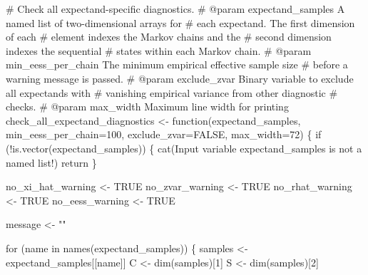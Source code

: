 \documentclass[
  letterpaper,
  DIV=11,
  numbers=noendperiod]{scrartcl}
\newenvironment{Shaded}{\begin{snugshade}}{\end{snugshade}}
\newcommand{\AttributeTok}[1]{\textcolor[rgb]{0.40,0.45,0.13}{#1}}
\newcommand{\CommentTok}[1]{\textcolor[rgb]{0.37,0.37,0.37}{#1}}
\newcommand{\ConstantTok}[1]{\textcolor[rgb]{0.56,0.35,0.01}{#1}}
\newcommand{\ControlFlowTok}[1]{\textcolor[rgb]{0.00,0.23,0.31}{#1}}
\newcommand{\DecValTok}[1]{\textcolor[rgb]{0.68,0.00,0.00}{#1}}
\newcommand{\FunctionTok}[1]{\textcolor[rgb]{0.28,0.35,0.67}{#1}}
\newcommand{\NormalTok}[1]{\textcolor[rgb]{0.00,0.23,0.31}{#1}}
\newcommand{\OtherTok}[1]{\textcolor[rgb]{0.00,0.23,0.31}{#1}}
\newcommand{\SpecialCharTok}[1]{\textcolor[rgb]{0.37,0.37,0.37}{#1}}
\newcommand{\StringTok}[1]{\textcolor[rgb]{0.13,0.47,0.30}{#1}}
\begin{document}
\begin{Shaded}
\begin{Highlighting}[]
\CommentTok{\# Check all expectand{-}specific diagnostics.}
\CommentTok{\# @param expectand\_samples A named list of two{-}dimensional arrays for }
\CommentTok{\#                          each expectand.  The first dimension of each}
\CommentTok{\#                          element indexes the Markov chains and the }
\CommentTok{\#                          second dimension indexes the sequential }
\CommentTok{\#                          states within each Markov chain.}
\CommentTok{\# @param min\_eess\_per\_chain The minimum empirical effective sample size}
\CommentTok{\#                           before a warning message is passed.}
\CommentTok{\# @param exclude\_zvar Binary variable to exclude all expectands with}
\CommentTok{\#                     vanishing empirical variance from other diagnostic}
\CommentTok{\#                     checks.}
\CommentTok{\# @param max\_width Maximum line width for printing}
\NormalTok{check\_all\_expectand\_diagnostics }\OtherTok{\textless{}{-}} \ControlFlowTok{function}\NormalTok{(expectand\_samples,}
                                            \AttributeTok{min\_eess\_per\_chain=}\DecValTok{100}\NormalTok{,}
                                            \AttributeTok{exclude\_zvar=}\ConstantTok{FALSE}\NormalTok{,}
                                            \AttributeTok{max\_width=}\DecValTok{72}\NormalTok{) \{}
  \ControlFlowTok{if}\NormalTok{ (}\SpecialCharTok{!}\FunctionTok{is.vector}\NormalTok{(expectand\_samples)) \{}
    \FunctionTok{cat}\NormalTok{(}\StringTok{\textquotesingle{}Input variable \textasciigrave{}expectand\_samples\textasciigrave{} is not a named list!\textquotesingle{}}\NormalTok{)}
\NormalTok{    return}
\NormalTok{  \}}
  
\NormalTok{  no\_xi\_hat\_warning }\OtherTok{\textless{}{-}} \ConstantTok{TRUE}
\NormalTok{  no\_zvar\_warning }\OtherTok{\textless{}{-}} \ConstantTok{TRUE}
\NormalTok{  no\_rhat\_warning }\OtherTok{\textless{}{-}} \ConstantTok{TRUE}
\NormalTok{  no\_eess\_warning }\OtherTok{\textless{}{-}} \ConstantTok{TRUE}

\NormalTok{  message }\OtherTok{\textless{}{-}} \StringTok{""}

  \ControlFlowTok{for}\NormalTok{ (name }\ControlFlowTok{in} \FunctionTok{names}\NormalTok{(expectand\_samples)) \{}
\NormalTok{    samples }\OtherTok{\textless{}{-}}\NormalTok{ expectand\_samples[[name]]}
\NormalTok{    C }\OtherTok{\textless{}{-}} \FunctionTok{dim}\NormalTok{(samples)[}\DecValTok{1}\NormalTok{]}
\NormalTok{    S }\OtherTok{\textless{}{-}} \FunctionTok{dim}\NormalTok{(samples)[}\DecValTok{2}\NormalTok{]}
    

\end{Highlighting}
\end{Shaded}
\end{document}
